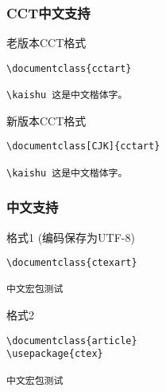 \begin{frame}[fragile]\frametitle{CCT中文支持}
\begin{block}{老版本CCT格式}
    \begin{verbatim}
\documentclass{cctart}

\kaishu 这是中文楷体字。

    \end{verbatim}
\end{block}

\begin{block}{新版本CCT格式}
    \begin{verbatim}
\documentclass[CJK]{cctart}

\kaishu 这是中文楷体字。

    \end{verbatim}
\end{block}
\end{frame}

\begin{frame}[fragile]\frametitle{\XeLaTeX{} 中文支持}
\begin{block}{\XeLaTeX{} 格式1 (编码保存为UTF-8)}
    \begin{verbatim}
\documentclass{ctexart}

中文宏包测试

    \end{verbatim}
\end{block}

\begin{block}{\XeLaTeX{}格式2}
    \begin{verbatim}
\documentclass{article}
\usepackage{ctex}

中文宏包测试

    \end{verbatim}
\end{block}
\end{frame}
